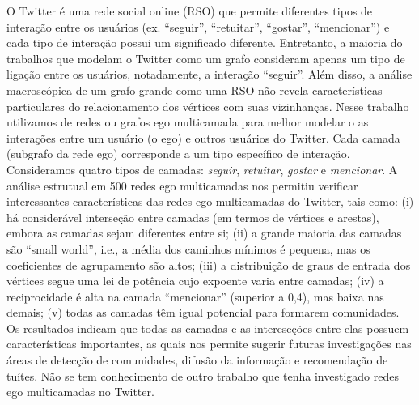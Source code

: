 
\begin{resumo}

O Twitter \'e uma rede social online (RSO) que permite diferentes tipos de  intera\c{c}\~{a}o entre os usu\'arios (ex. ``seguir'', ``retuitar'', ``gostar'', ``mencionar'') e cada tipo de intera\c{c}\~{a}o possui um significado diferente. Entretanto, a maioria do trabalhos que modelam o Twitter como um grafo consideram apenas um tipo de liga\c{c}\~{a}o entre os usu\'{a}rios, notadamente, a intera\c{c}\~{a}o ``seguir''. Al\'{e}m disso, a an\'{a}lise macrosc\'{o}pica  de um grafo  grande como uma RSO  n\~{a}o revela caracter\'{i}sticas particulares do relacionamento dos v\'{e}rtices com suas vizinhan\c{c}as. Nesse  trabalho utilizamos de redes ou grafos ego multicamada para melhor modelar o as intera\c{c}\~{o}es entre um usu\'{a}rio  (o ego) e outros usu\'{a}rios do Twitter.
Cada camada (subgrafo da rede ego) corresponde a um tipo espec\'{i}fico de intera\c{c}\~{a}o.  Consideramos  quatro tipos de camadas: {\em seguir}, {\em retuitar}, {\em gostar} e {\em mencionar}. A an\'{a}lise estrutual em 500 redes ego multicamadas nos permitiu verificar interessantes características das redes ego multicamadas do Twitter, tais como: (i) h\'{a} consider\'{a}vel interse\c{c}\~{a}o entre camadas (em termos de v\'{e}rtices e arestas), embora as camadas sejam diferentes entre si; (ii)  a grande maioria das camadas s\~{a}o ``small world'', i.e., a m\'{e}dia dos caminhos m\'{i}nimos \'{e} pequena, mas os coeficientes de agrupamento s\~{a}o altos; (iii) a distribui\c{c}\~{a}o de graus de entrada dos v\'{e}rtices  segue uma lei de pot\^{e}ncia cujo expoente varia entre camadas; (iv) a reciprocidade \'{e} alta na camada ``mencionar'' (superior a 0,4), mas baixa nas demais;
(v) todas as camadas t\^{e}m igual potencial para formarem comunidades.  Os resultados indicam que todas as camadas e as interese\c{c}\~{o}es entre elas possuem caracter\'{i}sticas importantes,   as quais nos  permite sugerir futuras investiga\c{c}\~{o}es nas \'{a}reas de detec\c{c}\~{a}o de comunidades, difus\~{a}o da informa\c{c}\~{a}o  e recomenda\c{c}\~{a}o de tu\'{i}tes. N\~{a}o se tem conhecimento de outro trabalho  que tenha investigado redes ego multicamadas no Twitter. 
\end{resumo}

